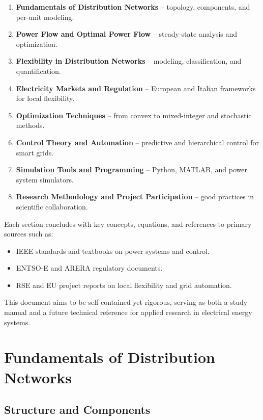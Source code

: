 \documentclass[11pt]{article}
\begin{document}
	\begin{enumerate}
		\item \textbf{Fundamentals of Distribution Networks} – topology, components, and per-unit modeling.
		\item \textbf{Power Flow and Optimal Power Flow} – steady-state analysis and optimization.
		\item \textbf{Flexibility in Distribution Networks} – modeling, classification, and quantification.
		\item \textbf{Electricity Markets and Regulation} – European and Italian frameworks for local flexibility.
		\item \textbf{Optimization Techniques} – from convex to mixed-integer and stochastic methods.
		\item \textbf{Control Theory and Automation} – predictive and hierarchical control for smart grids.
		\item \textbf{Simulation Tools and Programming} – Python, MATLAB, and power system simulators.
		\item \textbf{Research Methodology and Project Participation} – good practices in scientific collaboration.
	\end{enumerate}
	
	Each section concludes with key concepts, equations, and references to primary sources such as:
	\begin{itemize}
		\item IEEE standards and textbooks on power systems and control.
		\item ENTSO-E and ARERA regulatory documents.
		\item RSE and EU project reports on local flexibility and grid automation.
	\end{itemize}
	
	This document aims to be self-contained yet rigorous, serving as both a study manual and a future technical reference for applied research in electrical energy systems.
	
	
	\section{Fundamentals of Distribution Networks}
	
	\subsection{Structure and Components}
	
\end{document}
